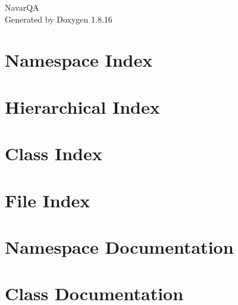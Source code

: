 \let\mypdfximage\pdfximage\def\pdfximage{\immediate\mypdfximage}\documentclass[twoside]{book}
\newcommand{\+}{\discretionary{\mbox{\scriptsize$\hookleftarrow$}}{}{}}
\newcommand{\clearemptydoublepage}{%
  \newpage{\pagestyle{empty}\cleardoublepage}%
}
\begin{document}
\hypersetup{pageanchor=false,
             bookmarksnumbered=true,
             pdfencoding=unicode
            }
\begin{titlepage}
\vspace*{7cm}
\begin{center}%
{\Large Navar\+QA }\\
\vspace*{1cm}
{\large Generated by Doxygen 1.8.16}\\
\end{center}
\end{titlepage}
\clearemptydoublepage
{}
\tableofcontents
\clearemptydoublepage
{}
\hypersetup{pageanchor=true}

\chapter{Namespace Index}

\chapter{Hierarchical Index}

\chapter{Class Index}

\chapter{File Index}

\chapter{Namespace Documentation}






\chapter{Class Documentation}















\end{document}
